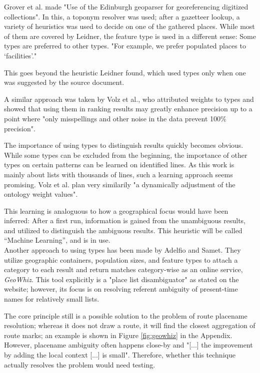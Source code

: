 \documentclass[11pt]{article}
\begin{document}
\newpage

Grover et al. made "Use of the Edinburgh geoparser for georeferencing digitized collections".\cite[title]{grover10} In this, a toponym resolver was used; after a gazetteer lookup, a variety of heuristics was used to decide on one of the gathered places. While most of them are covered by Leidner, the feature type is used in a different sense: Some types are preferred to other types. "For example, we prefer populated places to ‘facilities’."\cite[p. 3883]{grover10}

This goes beyond the heuristic Leidner found, which used types only when one was suggested by the source document.

A similar approach was taken by Volz et al., who attributed weights to types and showed that using them in ranking results may greatly enhance precision up to a point where "only misspellings and other noise in the data prevent 100\% precision". \cite[p. 5]{volz07}

The importance of using types to distinguish results quickly becomes obvious. While some types can be excluded from the beginning, the importance of other types on certain patterns can be learned on identified lines. As this work is mainly about lists with thousands of lines, such a learning approach seems promising. Volz et al. plan very similarily "a dynamically adjustment of the ontology weight values". \cite[p. 7]{volz07}

This learning is analoguous to how a geographical focus would have been inferred: After a first run, information is gained from the unambiguous results, and utilized to distinguish the ambiguous results. This heuristic will be called ``Machine Learning'', and is in use.\\

Another approach to using types has been made by Adelfio and Samet. They utilize geographic containers, population sizes, and feature types to attach a category to each result and return matches category-wise as an online service, \emph{GeoWhiz}. \cite{adelfio13b}\cite{adelfio13a} This tool explicitly is a "place list disambiguator" as stated on the website; however, its focus is on resolving referent ambiguity of present-time names for relatively small lists.

The core principle still is a possible solution to the problem of route placename resolution; whereas it does not draw a route, it will find the closest aggregation of route marks; an example is shown in Figure \ref{fig:geowhiz} in the Appendix. However, placename ambiguity often happens close-by \cite{brunner08} and "[...] the improvement by adding the local context [...] is small". \cite{buscaldi10} Therefore, whether this technique actually resolves the problem would need testing.\\
\end{document}
